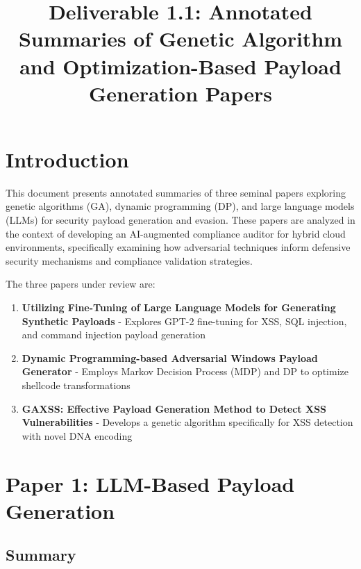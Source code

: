 \documentclass[11pt,conference]{IEEEtran}
\begin{document}
\title{Deliverable 1.1: Annotated Summaries of Genetic Algorithm and Optimization-Based Payload Generation Papers}

\author{
}

\maketitle

\section{Introduction}

This document presents annotated summaries of three seminal papers exploring genetic algorithms (GA), dynamic programming (DP), and large language models (LLMs) for security payload generation and evasion. These papers are analyzed in the context of developing an AI-augmented compliance auditor for hybrid cloud environments, specifically examining how adversarial techniques inform defensive security mechanisms and compliance validation strategies.

The three papers under review are:
\begin{enumerate}
    \item \textbf{Utilizing Fine-Tuning of Large Language Models for Generating Synthetic Payloads} - Explores GPT-2 fine-tuning for XSS, SQL injection, and command injection payload generation
    \item \textbf{Dynamic Programming-based Adversarial Windows Payload Generator} - Employs Markov Decision Process (MDP) and DP to optimize shellcode transformations
    \item \textbf{GAXSS: Effective Payload Generation Method to Detect XSS Vulnerabilities} - Develops a genetic algorithm specifically for XSS detection with novel DNA encoding
\end{enumerate}

\section{Paper 1: LLM-Based Payload Generation}

\subsection{Summary}
\end{document}
